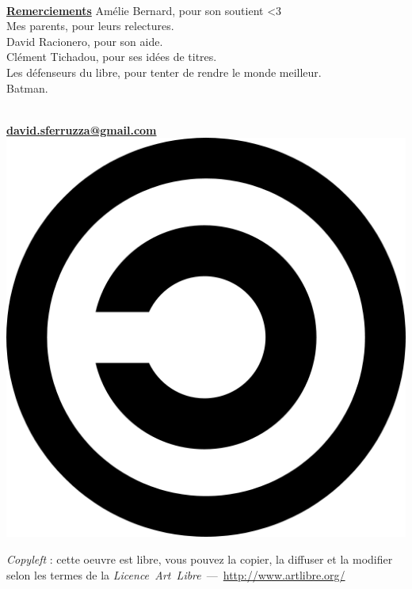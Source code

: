 \begin{titlepage}
~\vfill
\begin{center}
\begin{minipage}[c]{15cm}
	\begin{center}
	{\large \textbf{\underline{Remerciements}}}
	\linebreak
	\linebreak
	Amélie Bernard, pour son soutient <3\\
	Mes parents, pour leurs relectures.\\
	David Racionero, pour son aide.\\
	Clément Tichadou, pour ses idées de titres.\\
	Les défenseurs du libre, pour tenter de rendre le monde meilleur.\\
	Batman.
	\end{center}
\end{minipage}

\vspace{240pt}

\begin{minipage}[c]{10cm}
	\begin{center}
	\textbf{\titre}
	\linebreak
	\linebreak
	\moi\\
	\textbf{\href{mailto:david.sferruzza@gmail.com}{david.sferruzza@gmail.com}}
	\linebreak
	\linebreak
	\linebreak
	\linebreak
	\includegraphics[scale=.05]{images/copyleft.png} 
	\end{center}
	\textit{Copyleft} : cette oeuvre est libre, vous pouvez la copier,
	la diffuser et la modifier selon les termes de la
	\textit{Licence~Art~Libre}~---~\url{http://www.artlibre.org/}
\end{minipage}
\end{center}
\vfill
\end{titlepage}
